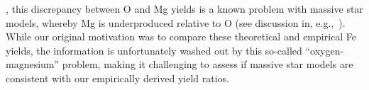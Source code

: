 \documentclass[foo.tex]{subfiles}
\begin{document}
{\citep[e.g.,][]{Weinberg2019}, this discrepancy between O and Mg yields is a
known problem with massive star models, whereby Mg is underproduced relative to
O (see discussion in, e.g.,~\citealp{Griffith2022}).
While our original motivation was to compare these theoretical and empirical Fe
yields, the information is unfortunately washed out by this so-called
``oxygen-magnesium'' problem, making it challenging to assess if massive star
models are consistent with our empirically derived yield ratios.







}
\end{document}
